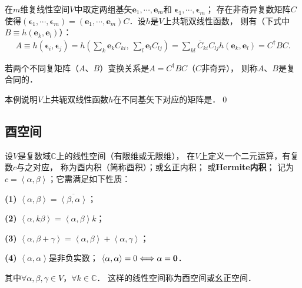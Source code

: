 \begin{example}
    在$m$维复线性空间$V$中取定两组基矢$\boldsymbol{e}_1,\cdots,\boldsymbol{e}_m$和
    $\boldsymbol{\epsilon}_1,\cdots,\boldsymbol{\epsilon}_m$；
    存在非奇异复数矩阵$C$使得$(\boldsymbol{\epsilon}_1,\cdots,\boldsymbol{\epsilon}_m)
    =(\boldsymbol{e}_1,\cdots,\boldsymbol{e}_m)C$．设$h$是$V$上共轭双线性函数，
    则有（下式中$B\equiv h(\boldsymbol{e}_k, \boldsymbol{e}_l)$）：
    \begin{align*}
        A\equiv h(\boldsymbol{\epsilon}_i, \boldsymbol{\epsilon}_j)
        =h\left(\sum\nolimits_k \boldsymbol{e}_k C_{ki},\ \sum\nolimits_l \boldsymbol{e}_l C_{lj}\right)
        =\sum\nolimits_{kl} \bar{C}_{ki} C_{lj} h(\boldsymbol{e}_k, \boldsymbol{e}_l)
        =C^\dagger B C. 
    \end{align*}
        
    若两个不同复矩阵（$A$、$B$）变换关系是$A= C^\dagger B C$（$C$非奇异），
    则称$A$、$B$是{\heiti 复合同的}．
    
    本例说明$V$上共轭双线性函数$h$在不同基矢下对应的矩阵是．\qed
\end{example}



\subsection{酉空间}\label{chcx:sec_unitary}

\begin{definition} \label{chcx:def_unitary-space}
    设$V$是复数域$\mathbb{C}$上的线性空间（有限维或无限维），
    在$V$上定义一个二元运算，有复数$c$与之对应，
    称为{\heiti 酉内积}（简称{\heiti 酉积}）；或{\heiti 幺正内积}；
    或{\heiti \bfseries Hermite内积}；
    记为$c=\left<\alpha,\beta\right>$；它需满足如下性质：
    
    {\bfseries (1)} $\left<\alpha,\beta\right>=\overline{\left<\beta,\alpha\right>}$；
    
    {\bfseries (2)} $\left<\alpha,k\beta\right>=\left<\alpha,\beta\right>k$；
    
    {\bfseries (3)} $\left<\alpha,\beta+\gamma\right>=\left<\alpha,\beta\right>+\left<\alpha,\gamma\right>$； 
    
    {\bfseries (4)} $\left<\alpha,\alpha\right>$是非负实数；
       $\left<\alpha,\alpha\right> = 0 \Longleftrightarrow \alpha={\bf 0}$．
    
    \noindent 其中$\forall\alpha,\beta,\gamma \in V$，$\forall k\in \mathbb{C}$．
    这样的线性空间称为{\heiti 酉空间}或{\heiti 幺正空间}． 
\end{definition}

